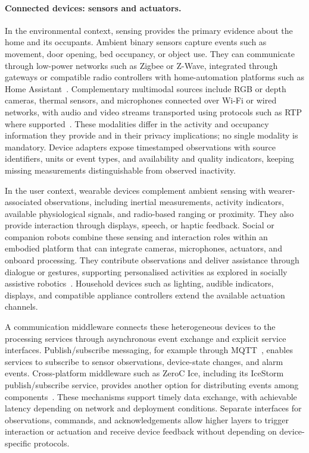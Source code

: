 \documentclass[10pt,twocolumn]{article}
\begin{document}
\paragraph{Connected devices: sensors and actuators.}
In the environmental context, sensing provides the primary evidence about the home and its occupants. Ambient binary sensors capture events such as movement, door opening, bed occupancy, or object use. They can communicate through low-power networks such as Zigbee or Z-Wave, integrated through gateways or compatible radio controllers with home-automation platforms such as Home Assistant~\cite{homeassistantZha,homeassistantZwave}. Complementary multimodal sources include RGB or depth cameras, thermal sensors, and microphones connected over Wi-Fi or wired networks, with audio and video streams transported using protocols such as RTP where supported~\cite{schulzrinne2003rtp}. These modalities differ in the activity and occupancy information they provide and in their privacy implications; no single modality is mandatory. Device adapters expose timestamped observations with source identifiers, units or event types, and availability and quality indicators, keeping missing measurements distinguishable from observed inactivity.

In the user context, wearable devices complement ambient sensing with wearer-associated observations, including inertial measurements, activity indicators, available physiological signals, and radio-based ranging or proximity. They also provide interaction through displays, speech, or haptic feedback. Social or companion robots combine these sensing and interaction roles within an embodied platform that can integrate cameras, microphones, actuators, and onboard processing. They contribute observations and deliver assistance through dialogue or gestures, supporting personalised activities as explored in socially assistive robotics~\cite{sorrentino2023cloudia}. Household devices such as lighting, audible indicators, displays, and compatible appliance controllers extend the available actuation channels.

A communication middleware connects these heterogeneous devices to the processing services through asynchronous event exchange and explicit service interfaces. Publish/subscribe messaging, for example through MQTT~\cite{oasis2019mqtt}, enables services to subscribe to sensor observations, device-state changes, and alarm events. Cross-platform middleware such as ZeroC Ice, including its IceStorm publish/subscribe service, provides another option for distributing events among components~\cite{zerocIcestorm}. These mechanisms support timely data exchange, with achievable latency depending on network and deployment conditions. Separate interfaces for observations, commands, and acknowledgements allow higher layers to trigger interaction or actuation and receive device feedback without depending on device-specific protocols.
\end{document}
